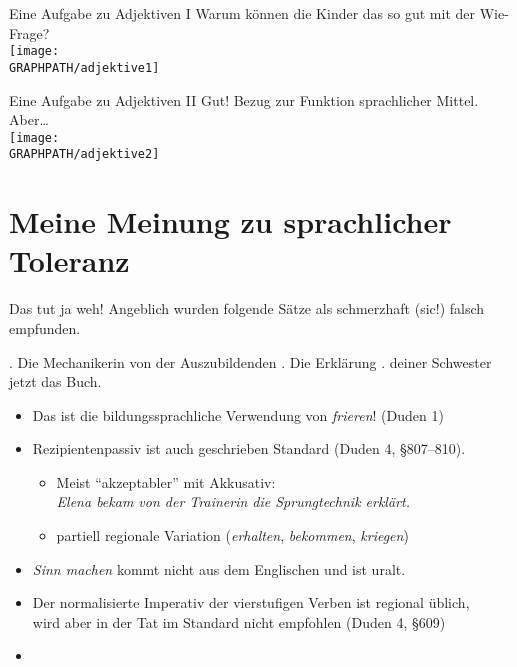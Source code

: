 \begin{frame}
  {Eine Aufgabe zu Adjektiven I}
  \pause
  Warum können die Kinder das so gut mit der Wie-Frage?\\
  \Halbzeile
  \pause
  \centering
  \texttt{[image: \\GRAPHPATH/adjektive1]}
\end{frame}

\begin{frame}
  {Eine Aufgabe zu Adjektiven II}
  Gut! Bezug zur Funktion sprachlicher Mittel. Aber\ldots\\
  \Zeile
  \pause
  \centering
  \texttt{[image: \\GRAPHPATH/adjektive2]}
\end{frame}

\section{Meine Meinung zu sprachlicher Toleranz}

\begin{frame}
  {Das tut ja weh!}
  \pause
  Angeblich wurden folgende Sätze als schmerzhaft (sic!) falsch empfunden.
  \pause
  \Viertelzeile
  \begin{exe}
    \ex {}.
    \pause
    \ex Die Mechanikerin  von der Auszubildenden .
    \pause
    \ex Die Erklärung .
    \pause
    \ex {} deiner Schwester jetzt das Buch.
  \end{exe}
  \pause
  \begin{itemize}[<+->]
    \item Das ist die bildungssprachliche Verwendung von \textit{frieren}! (Duden 1)
    \item \alert{Rezipientenpassiv ist auch geschrieben Standard} (Duden 4, §807–810).
      \begin{itemize}[<+->]
        \item Meist "`akzeptabler"' mit Akkusativ:\\
          \textit{Elena bekam von der Trainerin die Sprungtechnik erklärt.}
        \item partiell \alert{regionale Variation} (\textit{erhalten}, \textit{bekommen}, \textit{kriegen})
      \end{itemize}
    \item \textit{Sinn machen} kommt nicht aus dem Englischen und ist uralt.
    \item \alert{Der normalisierte Imperativ der vierstufigen Verben ist regional üblich},\\
      wird aber in der Tat im Standard nicht empfohlen (Duden 4, §609)
    \item {}
  \end{itemize}
\end{frame}

